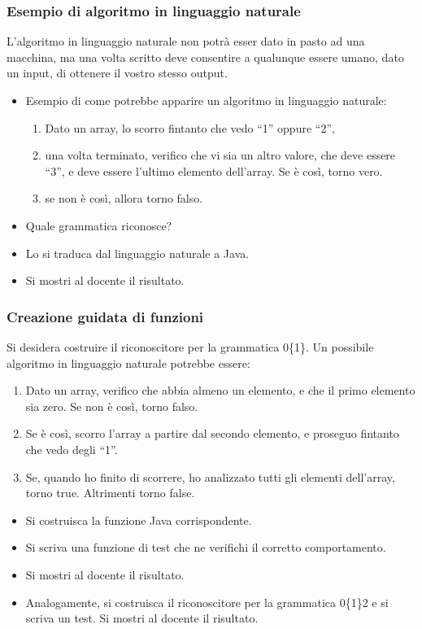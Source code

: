 \documentclass{beamer}
\begin{document}
\begin{frame}[fragile]
\frametitle{Esempio di algoritmo in linguaggio naturale}
L'algoritmo in linguaggio naturale non potrà esser dato in pasto ad una macchina, ma una volta scritto deve consentire a qualunque essere umano, dato un input, di ottenere il vostro stesso output.
\begin{itemize}
 \item Esempio di come potrebbe apparire un algoritmo in linguaggio naturale:
\begin{enumerate}
 \item Dato un array, lo scorro fintanto che vedo ``1'' oppure ``2'',
 \item una volta terminato, verifico che vi sia un altro valore, che deve essere ``3'', e deve essere l'ultimo elemento dell'array. Se è così, torno vero.
 \item se non è così, allora torno falso.
\end{enumerate}
 \item Quale grammatica riconosce?
 \item Lo si traduca dal linguaggio naturale a Java.
 \item Si mostri al docente il risultato.
\end{itemize}
\end{frame}

\begin{frame}[fragile]
\frametitle{Creazione guidata di funzioni}
Si desidera costruire il riconoscitore per la grammatica 0\{1\}. Un possibile algoritmo in linguaggio naturale potrebbe essere:
\begin{enumerate}
 \item Dato un array, verifico che abbia almeno un elemento, e che il primo elemento sia zero. Se non è così, torno falso.
 \item Se è così, scorro l'array a partire dal secondo elemento, e proseguo fintanto che vedo degli ``1''.
 \item Se, quando ho finito di scorrere, ho analizzato tutti gli elementi dell'array, torno true. Altrimenti torno false.
\end{enumerate}
\begin{itemize}
 \item Si costruisca la funzione Java corrispondente.
 \item Si scriva una funzione di test che ne verifichi il corretto comportamento.
 \item Si mostri al docente il risultato.
 \item Analogamente, si costruisca il riconoscitore per la grammatica 0\{1\}2 e si scriva un test. Si mostri al docente il risultato.
\end{itemize}
\end{frame}
\end{document}
